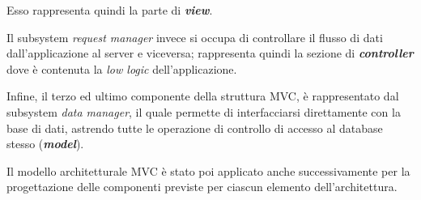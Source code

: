 Esso rappresenta quindi la parte di \textit{\textbf{view}}.

Il subsystem \textit{request manager} invece si occupa di controllare il flusso di dati dall'applicazione al server e viceversa; rappresenta quindi la sezione di \textit{\textbf{controller}} dove è contenuta la \textit{low logic} dell'applicazione.

Infine, il terzo ed ultimo componente della struttura MVC, è rappresentato dal subsystem \textit{data manager}, il quale permette di interfacciarsi direttamente con la base di dati, astrendo tutte le operazione di controllo di accesso al database stesso (\textit{\textbf{model}}).

Il modello architetturale MVC è stato poi applicato anche successivamente per la progettazione delle componenti previste per ciascun elemento dell'architettura.